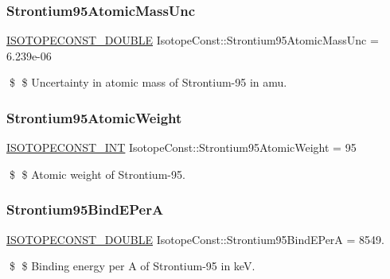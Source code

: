 \subsubsection{\texorpdfstring{Strontium95\+Atomic\+Mass\+Unc}{Strontium95AtomicMassUnc}}
{\footnotesize\ttfamily \mbox{\hyperlink{group___isotope_const-_macros_ga8f45a7272ce02c0b4c65c44636ed719a}{I\+S\+O\+T\+O\+P\+E\+C\+O\+N\+S\+T\+\_\+\+D\+O\+U\+B\+LE}} Isotope\+Const\+::\+Strontium95\+Atomic\+Mass\+Unc = 6.\+239e-\/06}

\$ \$ Uncertainty in atomic mass of Strontium-\/95 in amu. \mbox{\label{group___isotope_const-_strontium-_sr95_ga337d7ecb8f588ab12b146ee0cf41ff00}} 
\subsubsection{\texorpdfstring{Strontium95\+Atomic\+Weight}{Strontium95AtomicWeight}}
{\footnotesize\ttfamily \mbox{\hyperlink{group___isotope_const-_macros_ga5f18360b3e99483a35c32d789e62621c}{I\+S\+O\+T\+O\+P\+E\+C\+O\+N\+S\+T\+\_\+\+I\+NT}} Isotope\+Const\+::\+Strontium95\+Atomic\+Weight = 95}

\$ \$ Atomic weight of Strontium-\/95. \mbox{\label{group___isotope_const-_strontium-_sr95_gaa3d3491355afa30d83cda003af8f918e}} 
\subsubsection{\texorpdfstring{Strontium95\+Bind\+E\+PerA}{Strontium95BindEPerA}}
{\footnotesize\ttfamily \mbox{\hyperlink{group___isotope_const-_macros_ga8f45a7272ce02c0b4c65c44636ed719a}{I\+S\+O\+T\+O\+P\+E\+C\+O\+N\+S\+T\+\_\+\+D\+O\+U\+B\+LE}} Isotope\+Const\+::\+Strontium95\+Bind\+E\+PerA = 8549.}

\$ \$ Binding energy per A of Strontium-\/95 in keV. \mbox{\label{group___isotope_const-_strontium-_sr95_ga0206996ae9da0ca50af927d5b133ff0e}} 
